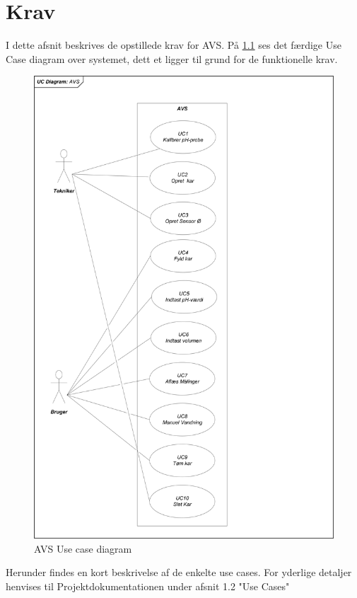 \chapter{Krav}

I dette afsnit beskrives de opstillede krav for AVS. På \ref{photo:UseCD} ses det færdige Use Case diagram over systemet, dett et ligger til grund for de funktionelle krav.

\begin{figure}[H]
	\centering
	\includegraphics[scale=0.6]{Krav/Billeder/AVS_UseCases}
	\caption{AVS Use case diagram}
	\label{photo:UseCD}
\end{figure}

Herunder findes en kort beskrivelse af de enkelte use cases. For yderlige detaljer henvises til Projektdokumentationen under afsnit 1.2 "Use Cases"

